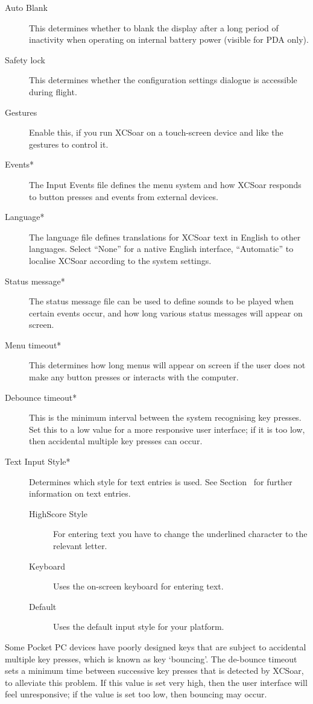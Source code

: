 \begin{description}
\item[Auto Blank] This determines whether to blank the display after a long
period of inactivity when operating on internal battery power (visible for PDA
only).

\item[Safety lock]  This determines whether the configuration settings dialogue is
accessible during flight.
\item[Gestures]  Enable this, if you run XCSoar on a touch-screen device and
like the gestures to control it.
\item[Events*]  The Input Events file defines the menu system and how XCSoar
responds to button presses and events from external devices.
\item[Language*]  The language file defines translations for XCSoar text in English to
other languages.  Select ``None'' for a native English interface, ``Automatic''
to localise XCSoar according to the system settings.
\item[Status message*]  The status message file can be used to define sounds to be played when certain
events occur, and how long various status messages will appear on screen.
\item[Menu timeout*]  This determines how long menus will appear on screen if the user
does not make any button presses or interacts with the computer.
\item[Debounce timeout*]  This is the minimum interval between the system recognising key presses. 
Set this to a low value for a more responsive user interface; if
it is too low, then accidental multiple key presses can occur.

\item[Text Input Style*] Determines which style for text entries is used. See Section~ for further information on text entries.
\begin{description}
\item[HighScore Style] For entering text you have to change the underlined character to the relevant letter.
\item[Keyboard] Uses the on-screen keyboard for entering text.
\item[Default] Uses the default input style for your platform.
\end{description}
\end{description}

Some Pocket PC devices have poorly designed keys that are subject to
accidental multiple key presses, which is known as key `bouncing'.  The
de-bounce timeout sets a minimum time between successive key presses
that is detected by XCSoar, to alleviate this problem.  If this value
is set very high, then the user interface will feel unresponsive; if
the value is set too low, then bouncing may occur.

